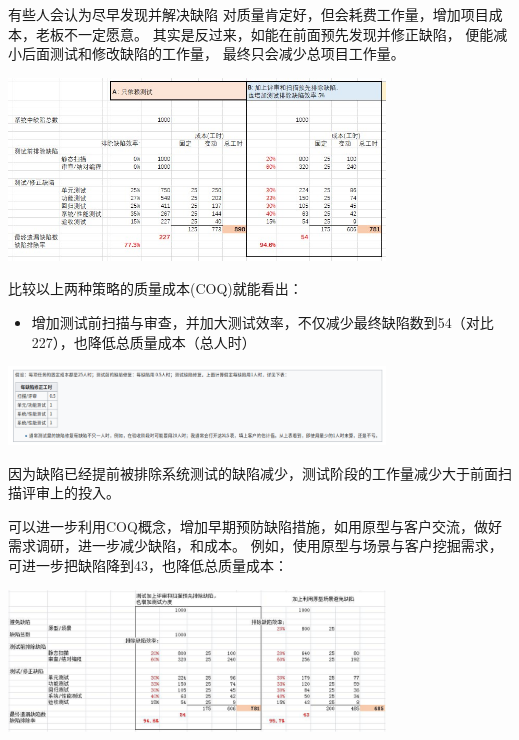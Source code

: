 有些人会认为尽早发现并解决缺陷
对质量肯定好，但会耗费工作量，增加项目成本，老板不一定愿意。
其实是反过来，如能在前面预先发现并修正缺陷，
便能减小后面测试和修改缺陷的工作量， 最终只会减少总项目工作量。


\includegraphics[width=10cm]{AR1FixVarCostScreenshot20221210144400.jpg}

比较以上两种策略的质量成本(COQ)就能看出：

\begin{itemize}
\tightlist
\item
  增加测试前扫描与审查，并加大测试效率，不仅减少最终缺陷数到54（对比227），也降低总质量成本（总人时）
\end{itemize}


\includegraphics[width=10cm]{Screenshotfrom20221221203231.png}



因为缺陷已经提前被排除系统测试的缺陷减少，测试阶段的工作量减少大于前面扫描评审上的投入。

可以进一步利用COQ概念，增加早期预防缺陷措施，如用原型与客户交流，做好需求调研，进一步减少缺陷，和成本。
例如，使用原型与场景与客户挖掘需求，可进一步把缺陷降到43，也降低总质量成本：


\includegraphics[width=10cm]{est缺陷表3.jpg}


